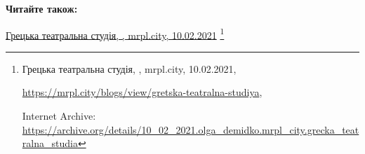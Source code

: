  
 
 
 
 

\def\pubIA{https://archive.org/details/10_02_2021.olga_demidko.mrpl_city.grecka_teatralna_studia}
\def\pubTitle{Грецька театральна студія}
\def\pubDate{10.02.2021}
\def\pubOrigin{https://mrpl.city/blogs/view/gretska-teatralna-studiya}
\def\pubAuthor{\pubAuthorDemidko}

\textbf{Читайте також:}\par\href{\pubIA}{%
\pubTitle, \pubAuthor, mrpl.city, \pubDate}%
\footnote{\pubTitle, \pubAuthor, mrpl.city, \pubDate, \par\url{\pubOrigin}, \par Internet Archive: \url{\pubIA}}
